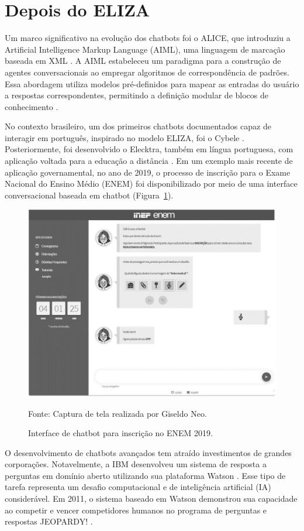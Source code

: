 \documentclass[14pt,a4paper,oneside]{book}
\begin{document}
\section{Depois do ELIZA}

Um marco significativo na evolução dos chatbots foi o ALICE, que introduziu a Artificial Intelligence Markup Language (AIML), uma linguagem de marcação baseada em XML \cite{Wallace2000}. A AIML estabeleceu um paradigma para a construção de agentes conversacionais ao empregar algoritmos de correspondência de padrões. Essa abordagem utiliza modelos pré-definidos para mapear as entradas do usuário a respostas correspondentes, permitindo a definição modular de blocos de conhecimento \cite{Wallace2000}.

No contexto brasileiro, um dos primeiros chatbots documentados capaz de interagir em português, inspirado no modelo ELIZA, foi o Cybele \cite{primo2001chatterbot}. Posteriormente, foi desenvolvido o Elecktra, também em língua portuguesa, com aplicação voltada para a educação a distância \cite{Leonhardt2003}. Em um exemplo mais recente de aplicação governamental, no ano de 2019, o processo de inscrição para o Exame Nacional do Ensino Médio (ENEM) foi disponibilizado por meio de uma interface conversacional baseada em chatbot (Figura~\ref{fig:enem}).

\begin{figure}
	\centering
	\caption{Interface de chatbot para inscrição no ENEM 2019.}
	\includegraphics[width=0.5\linewidth]{./fig/enem.png}
	\label{fig:enem}
	{\footnotesize 
	
	Fonte: Captura de tela realizada por Giseldo Neo.}
\end{figure}

O desenvolvimento de chatbots avançados tem atraído investimentos de grandes corporações. Notavelmente, a IBM desenvolveu um sistema de resposta a perguntas em domínio aberto utilizando sua plataforma Watson \cite{Ferrucci2012}. Esse tipo de tarefa representa um desafio computacional e de inteligência artificial (IA) considerável. Em 2011, o sistema baseado em Watson demonstrou sua capacidade ao competir e vencer competidores humanos no programa de perguntas e respostas JEOPARDY! \cite{Ferrucci2012}.
\end{document}
